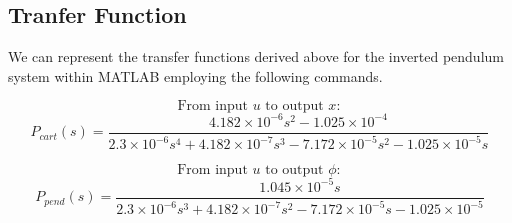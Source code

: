 \documentclass[12pt]{article}
\begin{document}
\subsection{Tranfer Function}
We can represent the transfer functions derived above for the inverted pendulum system within MATLAB employing the following commands.










\[
\text{From input } u \text{ to output } x:
\]
\[
P_{cart}(s) = 
\frac{4.182 \times 10^{-6} s^{2} - 1.025 \times 10^{-4}}
     {2.3 \times 10^{-6} s^{4} + 4.182 \times 10^{-7} s^{3} - 7.172 \times 10^{-5} s^{2} - 1.025 \times 10^{-5} s}
\]

\[
\text{From input } u \text{ to output } \phi:
\]
\[
P_{pend}(s) =
\frac{1.045 \times 10^{-5} s}
     {2.3 \times 10^{-6} s^{3} + 4.182 \times 10^{-7} s^{2} - 7.172 \times 10^{-5} s - 1.025 \times 10^{-5}}
\]
\end{document}
